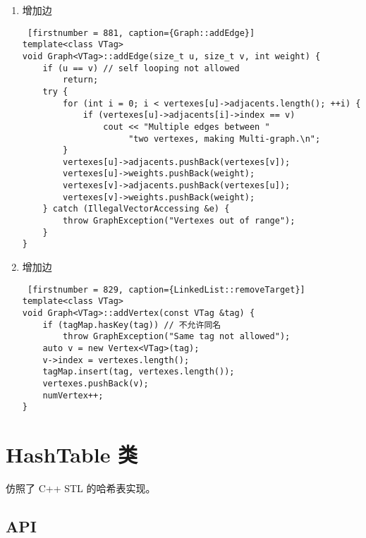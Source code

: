 {
\begin{enumerate}
      \item 增加边
\begin{lstlisting} [firstnumber = 881, caption={Graph::addEdge}]
template<class VTag>
void Graph<VTag>::addEdge(size_t u, size_t v, int weight) {
    if (u == v) // self looping not allowed
        return;
    try {
        for (int i = 0; i < vertexes[u]->adjacents.length(); ++i) {
            if (vertexes[u]->adjacents[i]->index == v)
                cout << "Multiple edges between "
                     "two vertexes, making Multi-graph.\n";
        }
        vertexes[u]->adjacents.pushBack(vertexes[v]);
        vertexes[u]->weights.pushBack(weight);
        vertexes[v]->adjacents.pushBack(vertexes[u]);
        vertexes[v]->weights.pushBack(weight);
    } catch (IllegalVectorAccessing &e) {
        throw GraphException("Vertexes out of range");
    }
} \end{lstlisting}
      \item 增加边
\begin{lstlisting} [firstnumber = 829, caption={LinkedList::removeTarget}]
template<class VTag>
void Graph<VTag>::addVertex(const VTag &tag) {
    if (tagMap.hasKey(tag)) // 不允许同名
        throw GraphException("Same tag not allowed");
    auto v = new Vertex<VTag>(tag);
    v->index = vertexes.length();
    tagMap.insert(tag, vertexes.length());
    vertexes.pushBack(v);
    numVertex++;
} \end{lstlisting}
      
\end{enumerate}
}

\chapter{HashTable 类}

仿照了 C++ STL 的哈希表实现。

\section{API}

